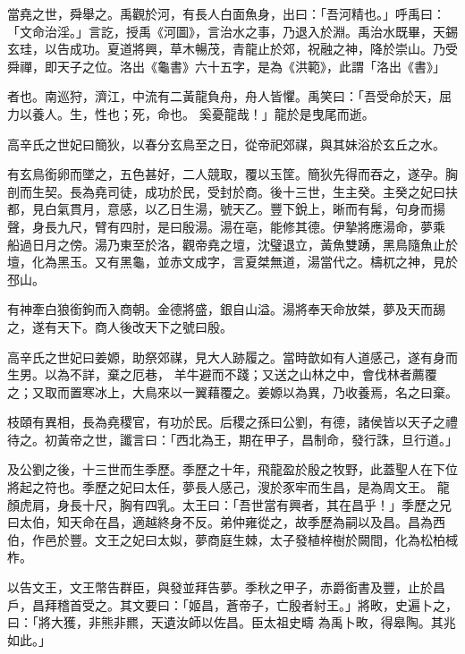 \begin{pinyinscope}
 當堯之世，舜舉之。禹觀於河，有長人白面魚身，出曰：「吾河精也。」呼禹曰：「文命治淫。」言訖，授禹《河圖》，言治水之事，乃退入於淵。禹治水既畢，天錫玄珪，以告成功。夏道將興，草木暢茂，青龍止於郊，祝融之神，降於崇山。乃受舜禪，即天子之位。洛出《龜書》六十五字，是為《洪範》，此謂「洛出《書》」



 者也。南巡狩，濟江，中流有二黃龍負舟，舟人皆懼。禹笑曰：「吾受命於天，屈力以養人。生，性也；死，命也。
 奚憂龍哉！」龍於是曳尾而逝。



 高辛氏之世妃曰簡狄，以春分玄鳥至之日，從帝祀郊禖，與其妹浴於玄丘之水。



 有玄鳥銜卵而墜之，五色甚好，二人競取，覆以玉筐。簡狄先得而吞之，遂孕。胸剖而生契。長為堯司徒，成功於民，受封於商。後十三世，生主癸。主癸之妃曰扶都，見白氣貫月，意感，以乙日生湯，號天乙。豐下銳上，晰而有髯，句身而揚聲，身長九尺，臂有四肘，是曰殷湯。湯在亳，能修其德。伊摯將應湯命，夢乘
 船過日月之傍。湯乃東至於洛，觀帝堯之壇，沈璧退立，黃魚雙踴，黑鳥隨魚止於壇，化為黑玉。又有黑龜，並赤文成字，言夏桀無道，湯當代之。檮杌之神，見於邳山。



 有神牽白狼銜鉤而入商朝。金德將盛，銀自山溢。湯將奉天命放桀，夢及天而舓之，遂有天下。商人後改天下之號曰殷。



 高辛氏之世妃曰姜嫄，助祭郊禖，見大人跡履之。當時歆如有人道感己，遂有身而生男。以為不詳，棄之厄巷，
 羊牛避而不踐；又送之山林之中，會伐林者薦覆之；又取而置寒冰上，大鳥來以一翼藉覆之。姜嫄以為異，乃收養焉，名之曰棄。



 枝頤有異相，長為堯稷官，有功於民。后稷之孫曰公劉，有德，諸侯皆以天子之禮待之。初黃帝之世，讖言曰：「西北為王，期在甲子，昌制命，發行誅，旦行道。」



 及公劉之後，十三世而生季歷。季歷之十年，飛龍盈於殷之牧野，此蓋聖人在下位將起之符也。季歷之妃曰太任，夢長人感己，溲於豕牢而生昌，是為周文王。
 龍顏虎肩，身長十尺，胸有四乳。太王曰：「吾世當有興者，其在昌乎！」季歷之兄曰太伯，知天命在昌，適越終身不反。弟仲雍從之，故季歷為嗣以及昌。昌為西伯，作邑於豐。文王之妃曰太姒，夢商庭生棘，太子發植梓樹於闕間，化為松柏棫柞。



 以告文王，文王幣告群臣，與發並拜告夢。季秋之甲子，赤爵銜書及豐，止於昌戶，昌拜稽首受之。其文要曰：「姬昌，蒼帝子，亡殷者紂王。」將畋，史遍卜之，曰：「將大獲，非熊非羆，天遺汝師以佐昌。臣太祖史疇
 為禹卜畋，得皋陶。其兆如此。」




\end{pinyinscope}
